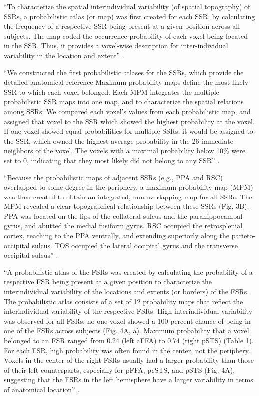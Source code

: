 ``To characterize the spatial interindividual variability (of spatial
topography) of SSRs, a probabilistic atlas (or map) was first created for each
SSR, by calculating the frequency of a respective SSR being present at a given
position across all subjects.
%
The map coded the occurrence probability of each voxel being located in the SSR.
%
Thus, it provides a voxel-wise description for inter-individual variability in
the location and extent'' \citep{zhen2017quantifying}.

``We constructed the first probabilistic atlases for the SSRs, which provide the
detailed anatomical reference
%
Maximum-probability maps define the most likely SSR to which each voxel
belonged.
%
Each MPM integrates the multiple probabilistic SSR maps into one map, and to
characterize the spatial relations among SSRs:
%
We compared each voxel's values from each probabilistic map, and assigned that
voxel to the SSR which showed the highest probability at the voxel.
%
If one voxel showed equal probabilities for multiple SSRs, it would be assigned
to the SSR, which owned the highest average probability in the 26 immediate
neighbors of the voxel.
%
The voxels with a maximal probability below 10\% were set to 0, indicating that
they most likely did not belong to any SSR'' \citep{zhen2017quantifying}.


``Because the probabilistic maps of adjacent SSRs (e.g., PPA and RSC) overlapped
to some degree in the periphery, a maximum-probability map (MPM) was then
created to obtain an integrated, non-overlapping map for all SSRs.
%
The MPM revealed a clear topographical relationship between these SSRs (Fig.
3B).
%
PPA was located on the lips of the collateral sulcus and the parahippocampal
gyrus, and abutted the medial fusiform gyrus.
%
RSC occupied the retrosplenial cortex, reaching to the PPA ventrally, and
extending superiorly along the parieto-occipital sulcus.
%
TOS occupied the lateral occipital gyrus and the transverse occipital sulcus''
\citep{zhen2017quantifying}.



``A probabilistic atlas of the FSRs was created by calculating the probability
of a respective FSR being present at a given position to characterize the
interindividual variability of the locations and extents (or borders) of the
FSRs.
%
The probabilistic atlas consists of a set of 12 probability maps that reflect
the interindividual variability of the respective FSRs.
%
High interindividual variability was observed for all FSRs: no one voxel showed
a 100-percent chance of being in one of the FSRs across subjects (Fig. 4A, a).
%
Maximum probability that a voxel belonged to an FSR ranged from 0.24 (left aFFA)
to 0.74 (right pSTS) (Table 1).
%
For each FSR, high probability was often found in the center, not the periphery.
%
Voxels in the center of the right FSRs usually had a larger probability than
those of their left counterparts, especially for pFFA, pcSTS, and pSTS (Fig.
4A), suggesting that the FSRs in the left hemisphere have a larger variability
in terms of anatomical location'' \citet{zhen2015quantifying}.


